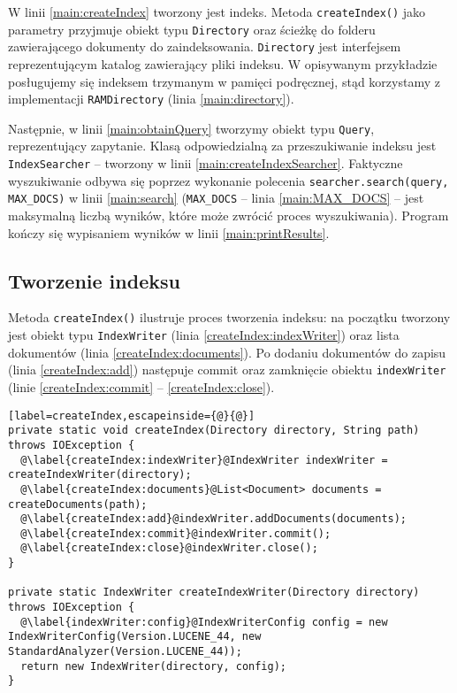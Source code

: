 W linii \ref{main:createIndex} tworzony jest indeks. Metoda \texttt{createIndex()} jako parametry przyjmuje obiekt typu \texttt{Directory} oraz ścieżkę do folderu zawierającego dokumenty do zaindeksowania. \texttt{Directory} jest interfejsem reprezentującym katalog zawierający pliki indeksu. W opisywanym przykładzie posługujemy się indeksem trzymanym w pamięci podręcznej, stąd korzystamy z implementacji \texttt{RAMDirectory} (linia \ref{main:directory}).

Następnie, w linii \ref{main:obtainQuery} tworzymy obiekt typu \texttt{Query}, reprezentujący zapytanie. Klasą odpowiedzialną za przeszukiwanie indeksu jest \texttt{IndexSearcher} -- tworzony w linii \ref{main:createIndexSearcher}. Faktyczne wyszukiwanie odbywa się poprzez wykonanie polecenia \texttt{searcher.search(query, MAX\_DOCS)} w linii \ref{main:search} (\texttt{MAX\_DOCS} -- linia \ref{main:MAX_DOCS} -- jest maksymalną liczbą wyników, które może zwrócić proces wyszukiwania). Program kończy się wypisaniem wyników w linii \ref{main:printResults}.

\subsection{Tworzenie indeksu}

Metoda \texttt{createIndex()} ilustruje proces tworzenia indeksu: na początku tworzony jest obiekt typu \texttt{IndexWriter} (linia \ref{createIndex:indexWriter}) oraz lista dokumentów (linia \ref{createIndex:documents}). Po dodaniu dokumentów do zapisu (linia \ref{createIndex:add}) następuje commit oraz zamknięcie obiektu \texttt{indexWriter} (linie \ref{createIndex:commit} -- \ref{createIndex:close}).

\begin{lstlisting}[label=createIndex,escapeinside={@}{@}]
private static void createIndex(Directory directory, String path) throws IOException {
  @\label{createIndex:indexWriter}@IndexWriter indexWriter = createIndexWriter(directory);
  @\label{createIndex:documents}@List<Document> documents = createDocuments(path);
  @\label{createIndex:add}@indexWriter.addDocuments(documents);
  @\label{createIndex:commit}@indexWriter.commit();
  @\label{createIndex:close}@indexWriter.close();
}

private static IndexWriter createIndexWriter(Directory directory) throws IOException {
  @\label{indexWriter:config}@IndexWriterConfig config = new IndexWriterConfig(Version.LUCENE_44, new StandardAnalyzer(Version.LUCENE_44));
  return new IndexWriter(directory, config);
}
\end{lstlisting}

